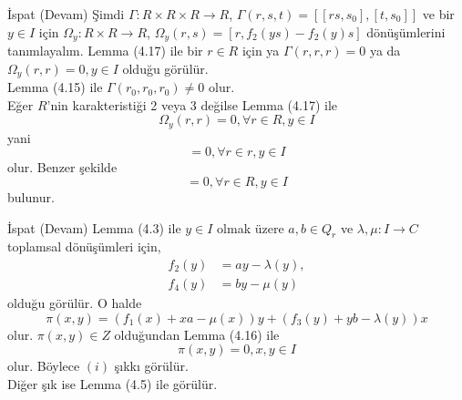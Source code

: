 \documentclass{beamer}
\begin{document}
\begin{frame}
\footnotesize

\begin{block}{İspat (Devam)}
 Şimdi $\Gamma \colon R \times R \times R \to R$, $\Gamma(r,s,t) = [[rs,s_0],[t,s_0]]$ ve bir $y \in I$ için $\Omega_y \colon R \times R \to R$, $\Omega_y(r,s) = [r, f_2(ys)-f_2(y)s]$ dönüşümlerini tanımlayalım. Lemma (4.17) ile bir $r \in R$ için ya $\Gamma(r,r,r) = 0$ ya da $\Omega_y(r,r) = 0, y \in I$ olduğu görülür.\\
Lemma (4.15) ile $\Gamma(r_0,r_0,r_0) \neq 0$ olur.\\
Eğer $R$'nin karakteristiği 2 veya 3 değilse Lemma (4.17) ile
\begin{equation*}
    \Omega_y(r,r) = 0, \forall r \in R, y \in I
\end{equation*}
yani
\begin{equation*}
    [r, f_2(yr)-f_2(y)r] = 0, \forall r \in r, y \in I
\end{equation*}
olur. Benzer şekilde
\begin{equation*}
    [r, f_4(yr)-f_4(y)r] = 0, \forall r \in R, y \in I
\end{equation*}
bulunur.
\end{block}
    
\end{frame}

\begin{frame}
\footnotesize

\begin{block}{İspat (Devam)}
Lemma (4.3) ile $y \in I$ olmak üzere $a, b \in Q_r$ ve $\lambda, \mu \colon I \to C$ toplamsal dönüşümleri için,
\begin{align*}
    f_2(y) &= ay - \lambda(y),\\
    f_4(y) &= by - \mu(y)
\end{align*}
olduğu görülür. O halde
\begin{equation*}
    \pi(x,y) = (f_1(x) + xa - \mu(x))y + (f_3(y) + yb - \lambda(y))x
\end{equation*}
olur. $\pi(x,y) \in Z$ olduğundan Lemma (4.16) ile
\begin{equation*}
    \pi(x,y) = 0, x, y \in I
\end{equation*}
olur. Böylece $(i)$ şıkkı görülür.\\
Diğer şık ise Lemma (4.5) ile görülür. 
\end{block}
    
\end{frame}
\end{document}
